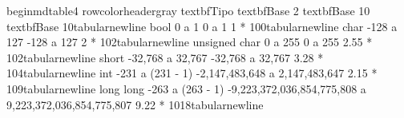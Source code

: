 \markdownRendererDocumentBegin
\markdownRendererSectionBegin
\markdownRendererSectionBegin
{}\markdownRendererInterblockSeparator
{}\markdownRendererSectionBegin
{}\markdownRendererInterblockSeparator
{}\markdownRendererBackslash{}begin\markdownRendererLeftBrace{}mdtable4\markdownRendererRightBrace{}\markdownRendererSoftLineBreak
{}\markdownRendererBackslash{}rowcolor\markdownRendererLeftBrace{}headergray\markdownRendererRightBrace{}\markdownRendererSoftLineBreak
{}\markdownRendererBackslash{}textbf\markdownRendererLeftBrace{}Tipo\markdownRendererRightBrace{} \markdownRendererAmpersand{} \markdownRendererBackslash{}textbf\markdownRendererLeftBrace{}Base 2\markdownRendererRightBrace{} \markdownRendererAmpersand{} \markdownRendererBackslash{}textbf\markdownRendererLeftBrace{}Base 10\markdownRendererRightBrace{} \markdownRendererAmpersand{} \markdownRendererBackslash{}textbf\markdownRendererLeftBrace{}Base 10\markdownRendererRightBrace{}\markdownRendererBackslash{}tabularnewline\markdownRendererSoftLineBreak
{}bool \markdownRendererAmpersand{} 0 a 1 \markdownRendererAmpersand{} 0 a 1 \markdownRendererAmpersand{} 1 * 10\markdownRendererCircumflex{}0\markdownRendererBackslash{}tabularnewline\markdownRendererSoftLineBreak
{}char \markdownRendererAmpersand{} -128 a 127 \markdownRendererAmpersand{} -128 a 127 \markdownRendererAmpersand{} 2 * 10\markdownRendererCircumflex{}2\markdownRendererBackslash{}tabularnewline\markdownRendererSoftLineBreak
{}unsigned char \markdownRendererAmpersand{} 0 a 255 \markdownRendererAmpersand{} 0 a 255 \markdownRendererAmpersand{} 2.55 * 10\markdownRendererCircumflex{}2\markdownRendererBackslash{}tabularnewline\markdownRendererSoftLineBreak
{}short \markdownRendererAmpersand{} -32,768 a 32,767 \markdownRendererAmpersand{} -32,768 a 32,767 \markdownRendererAmpersand{} 3.28 * 10\markdownRendererCircumflex{}4\markdownRendererBackslash{}tabularnewline\markdownRendererSoftLineBreak
{}int \markdownRendererAmpersand{} -2\markdownRendererCircumflex{}\markdownRendererLeftBrace{}31\markdownRendererRightBrace{} a (2\markdownRendererCircumflex{}\markdownRendererLeftBrace{}31\markdownRendererRightBrace{} - 1) \markdownRendererAmpersand{} -2,147,483,648 a 2,147,483,647 \markdownRendererAmpersand{} 2.15 * 10\markdownRendererCircumflex{}9\markdownRendererBackslash{}tabularnewline\markdownRendererSoftLineBreak
{}long long \markdownRendererAmpersand{} -2\markdownRendererCircumflex{}\markdownRendererLeftBrace{}63\markdownRendererRightBrace{} a (2\markdownRendererCircumflex{}\markdownRendererLeftBrace{}63\markdownRendererRightBrace{} - 1) \markdownRendererAmpersand{} -9,223,372,036,854,775,808 a 9,223,372,036,854,775,807 \markdownRendererAmpersand{} 9.22 * 10\markdownRendererCircumflex{}\markdownRendererLeftBrace{}18\markdownRendererRightBrace{}\markdownRendererBackslash{}tabularnewline\markdownRendererSoftLineBreak
